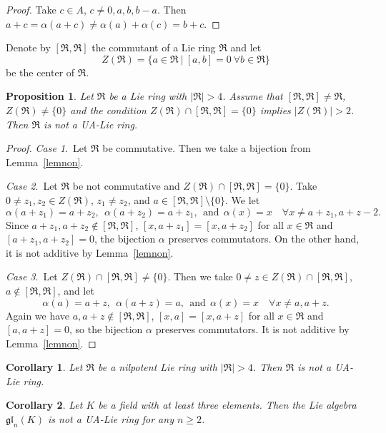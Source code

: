 \documentclass[a4paper,draft,reqno,12pt]{amsart}
\newtheorem{proposition}{Proposition}
\newtheorem{corollary}{Corollary}
\theoremstyle{definition}
\theoremstyle{remark}
\def\RRR{\mathfrak{R}}
\def\gl{\mathfrak{gl}}
\renewcommand{\ge}{\geqslant}
\begin{document}
\begin{proof} 
Take $c\in A$, $c\ne 0,a,b,b-a$. Then $a+c=\alpha(a+c)\ne\alpha(a)+\alpha(c)=b+c$.
\end{proof}

Denote by $[\RRR,\RRR]$ the commutant of a Lie ring $\RRR$ and let
$$
Z(\RRR)=\{a\in\RRR \ | \ [a,b]=0 \ \forall b\in\RRR\}
$$
be the center of $\RRR$. 

\begin{proposition}
\label{neg}
Let $\RRR$ be a Lie ring with $|\RRR|>4$. Assume that $[\RRR,\RRR]\ne\RRR$, $Z(\RRR)\ne\{0\}$ and the condition $Z(\RRR)\cap [\RRR,\RRR]=\{0\}$ implies $|Z(\RRR)|>2$. 
Then $\RRR$ is not a UA-Lie ring. 
\end{proposition}

\begin{proof} 
{\it Case 1}.\ Let $\RRR$ be commutative. Then we take a bijection from Lemma~\ref{lemnon}. 

\smallskip

{\it Case 2}.\ Let $\RRR$ be not commutative and $Z(\RRR)\cap [\RRR,\RRR]=\{0\}$. Take $0\ne z_1,z_2\in Z(\RRR)$, $z_1\ne z_2$, and $a\in [\RRR,\RRR]\setminus\{0\}$. 
We let 
$$
\alpha(a+z_1)=a+z_2, \ \  \alpha(a+z_2)=a+z_1, \ \ \text{and} \ \ \alpha(x)=x \quad \forall x\ne a+z_1, a+z-2. 
$$
Since $a+z_1,a+z_2\notin[\RRR,\RRR]$, $[x,a+z_1]=[x,a+z_2]$ for all $x\in\RRR$ and $[a+z_1,a+z_2]=0$, the bijection $\alpha$ preserves commutators. On the other hand, it is not additive by Lemma~\ref{lemnon}.

\smallskip

{\it Case 3}.\ Let $Z(\RRR)\cap [\RRR,\RRR]\ne\{0\}$. Then we take $0\ne z\in Z(\RRR)\cap [\RRR,\RRR]$, $a\notin [\RRR,\RRR]$, and let
$$
\alpha(a)=a+z, \ \  \alpha(a+z)=a, \ \ \text{and} \ \ \alpha(x)=x \quad \forall x\ne a, a+z. 
$$
Again we have $a,a+z\notin[\RRR,\RRR]$, $[x,a]=[x,a+z]$ for all $x\in\RRR$ and $[a,a+z]=0$, so the bijection $\alpha$ preserves commutators. It is not additive by Lemma~\ref{lemnon}.
\end{proof} 

\begin{corollary}
Let $\RRR$ be a nilpotent Lie ring with $|\RRR|>4$. Then $\RRR$ is not a UA-Lie ring.
\end{corollary}

\begin{corollary}
Let $K$ be a field with at least three elements. Then the Lie algebra $\gl_n(K)$ is not a UA-Lie ring for any $n\ge 2$. 
\end{corollary}
\end{document}
